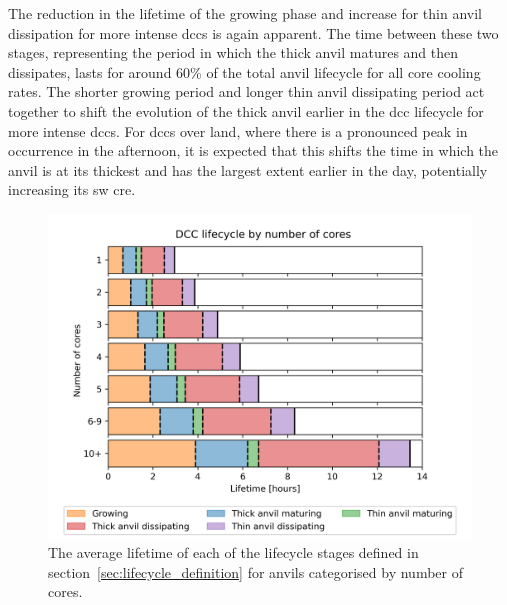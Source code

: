 The reduction in the lifetime of the growing phase and increase for thin anvil dissipation for more intense \acrshort{dcc}s is again apparent.
The time between these two stages, representing the period in which the thick anvil matures and then dissipates, lasts for around 60\% of the total anvil lifecycle for all core cooling rates.
The shorter growing period and longer thin anvil dissipating period act together to shift the evolution of the thick anvil earlier in the \acrshort{dcc} lifecycle for more intense \acrshort{dcc}s.
For \acrshort{dcc}s over land, where there is a pronounced peak in occurrence in the afternoon, it is expected that this shifts the time in which the anvil is at its thickest and has the largest extent earlier in the day, potentially increasing its \acrshort{sw} \acrshort{cre}.



\begin{figure}[tp]
    \centering
    \includegraphics[width=\textwidth]{figures/chapter3_11.png}
    \caption[
    The average lifetime of each lifecycle stage for anvils categorised by number of cores
    ]{
    The average lifetime of each of the lifecycle stages defined in section~\ref{sec:lifecycle_definition} for anvils categorised by number of cores.
    }
    \label{fig:anvil_number_of_cores_absolute_lifecycle}
\end{figure}

